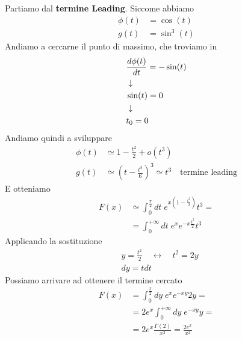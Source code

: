 Partiamo dal \textbf{termine Leading}. Siccome abbiamo
\begin{align}
	\phi(t) &= \cos(t) \\
	g(t) &= \sin^3(t)
\end{align}
Andiamo a cercarne il punto di massimo, che troviamo in
\begin{align}
	&\frac{d \phi(t)}{dt} = -\sin(t) \\ &\downarrow \nonumber \\
	&\sin(t) = 0 \nonumber \\ &\downarrow \nonumber \\
	&t_0=0
\end{align}
Andiamo quindi a sviluppare
\begin{align}
	\phi(t) &\simeq 1- \frac{t^2}{2} + o(t^3)  \\
	g(t) &\simeq \left( t - \frac{t^3}{6} \right)^3 \simeq t^3 \quad \text{termine leading}
\end{align}
E otteniamo
\begin{align}
	F(x) &\simeq \int_{0}^{\frac{\pi}{2}} dt \; e^{x\left(1- \frac{t^2}{2}\right)}t^3 = \nonumber\\
	&= \int_{0}^{+\infty} dt \; e^x e^{-x\frac{t^2}{2}}t^3
\end{align}
Applicando la sostituzione
\begin{align}
	&y= \frac{t^2}{2} \quad \leftrightarrow \quad t^2 = 2y \\
	&dy = tdt
\end{align}
Possiamo arrivare ad ottenere il termine cercato
\begin{align}
	F(x) &= \int_{0}^{\frac{\pi}{2}} dy \; e^x e^{-xy}2y = \nonumber\\
	&= 2e^x\int_{0}^{+\infty} dy \;e^{-xy}y = \nonumber\\
	&= 2e^x \frac{\Gamma(2)}{x^2} = \frac{2e^x}{x^2}
\end{align}

